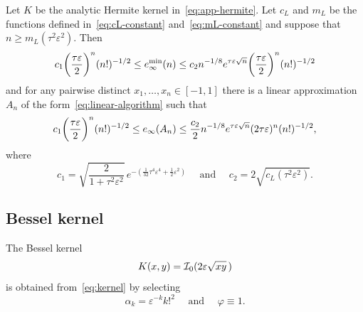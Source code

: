 \documentclass{mcom-l}
\numberwithin{equation}{section}
\numberwithin{theorem}{section} %
\begin{document}
\begin{corollary}
  Let $K$ be the analytic Hermite kernel in~\eqref{eq:app-hermite}.
  Let $c_L$ and $m_L$ be the functions defined in~\eqref{eq:cL-constant} and~\eqref{eq:mL-constant} and suppose that $n \geq m_L(\tau^2 \varepsilon^2)$.
  Then
  \begin{equation*}
    c_1 \bigg( \frac{\tau \varepsilon}{2} \bigg)^n (n!)^{-1/2} \leq e_\infty^{\min}(n) \leq  c_2 n^{-1/8} e^{\tau \varepsilon \sqrt{\smash[b]{n}}} \bigg( \frac{\tau \varepsilon}{2} \bigg)^n (n!)^{-1/2}
  \end{equation*}
  and for any pairwise distinct $x_1, \ldots, x_n \in [-1, 1]$ there is a linear approximation $A_n$ of the form~\eqref{eq:linear-algorithm} such that
  \begin{equation*}
    c_1 \bigg( \frac{\tau \varepsilon}{2} \bigg)^n (n!)^{-1/2} \leq e_\infty(A_n) \leq  \frac{c_2}{2} n^{-1/8} e^{\tau \varepsilon \sqrt{\smash[b]{n}}} (2 \tau \varepsilon)^n (n!)^{-1/2},
  \end{equation*}
  where
  \begin{equation*}
    c_1 = \sqrt{ \frac{2}{1 + \tau^2 \varepsilon^2}} \, e^{-(\frac{1}{32} \tau^4 \varepsilon^4 + \frac{1}{2} \varepsilon^2 ) } \quad \text{ and } \quad c_2 = 2 \sqrt{c_L(\tau^2 \varepsilon^2)}.
  \end{equation*}
\end{corollary}

\subsection{Bessel kernel}

The Bessel kernel
\begin{equation} \label{eq:app-bessel}
  K(x, y) =  \mathcal{I}_0( 2 \varepsilon \sqrt{\smash[b]{x y}} \, )
\end{equation}
is obtained from~\eqref{eq:kernel} by selecting
\begin{equation*}
  \alpha_k = \varepsilon^{-k} k!^2 \quad \text{ and } \quad \varphi \equiv 1.
\end{equation*}
\end{document}

